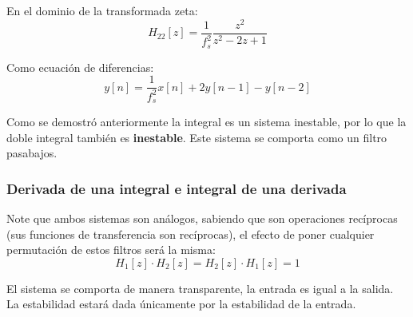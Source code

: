 				En el dominio de la transformada zeta:
				\begin{equation}
					H_{22}[z] = \frac{1}{f_{s}^{2}} \frac{z^{2}}{z^{2} -2z + 1}
				\end{equation}
				
				Como ecuación de diferencias:
				\begin{equation}
					y[n] = \frac{1}{f_{s}^{2}} x[n] + 2y[n-1] - y[n-2]
				\end{equation}
				
				Como se demostró anteriormente la integral es un sistema inestable, por lo que la doble integral también es \textbf{inestable}. Este sistema se comporta como un filtro pasabajos. 
				
			\subsubsection{Derivada de una integral e integral de una derivada}
				Note que ambos sistemas son análogos, sabiendo que son operaciones recíprocas (sus funciones de transferencia son recíprocas), el efecto de poner cualquier permutación de estos filtros será la misma:
				\begin{equation}
				H_{1}[z] \cdot H_{2}[z] = H_{2}[z] \cdot H_{1}[z] = 1 
				\end{equation}
				
				El sistema se comporta de manera transparente, la entrada es igual a la salida. La estabilidad estará dada únicamente por la estabilidad de la entrada.